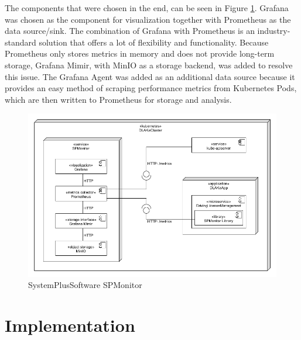 The components that were chosen in the end, can be seen in Figure \ref{fig:sps_spmonitor}.
Grafana was chosen as the component for visualization together with Prometheus as the data source/sink.
The combination of Grafana with Prometheus is an industry-standard solution that offers a lot of flexibility
and functionality.
Because Prometheus only stores metrics in memory and does not provide long-term storage,
Grafana Mimir, with MinIO as a storage backend, was added to resolve this issue.
The Grafana Agent was added as an additional data source because it provides an easy method
of scraping performance metrics from Kubernetes Pods, which are then written to Prometheus for storage and analysis.

\begin{figure}
	\centering
	\includegraphics[width=\textwidth]{figures/sps_spmonitor.png}
	\caption{SystemPlusSoftware SPMonitor}
	\label{fig:sps_spmonitor}
\end{figure}

\section{Implementation}